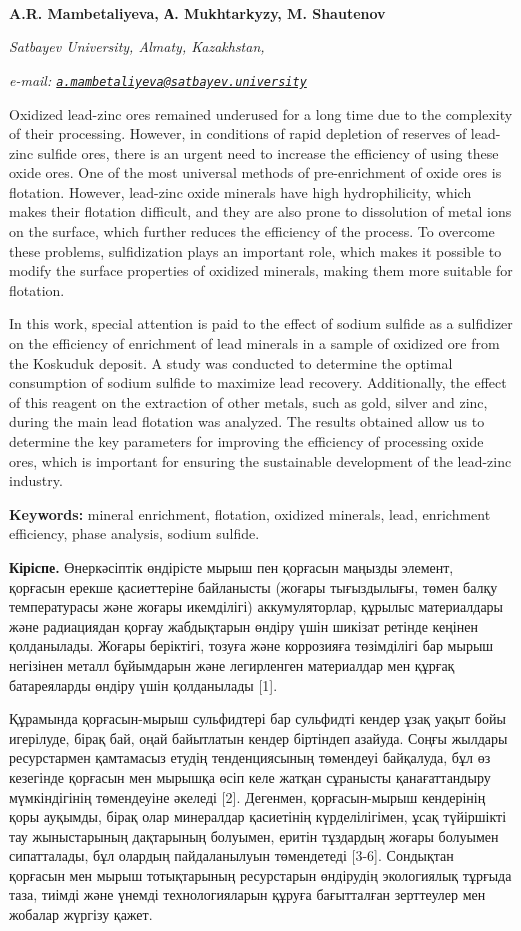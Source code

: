 {{\bfseries A.R. Mambetaliyeva\textsuperscript{\envelope }, А. Mukhtarkyzy, M.
Shautenov}

\emph{Satbayev University, Almaty, Kazakhstan,}

\emph{e-mail:
\href{mailto:a.mambetaliyeva@satbayev.university}{\nolinkurl{a.mambetaliyeva@satbayev.university}}}

Oxidized lead-zinc ores remained underused for a long time due to the
complexity of their processing. However, in conditions of rapid
depletion of reserves of lead-zinc sulfide ores, there is an urgent need
to increase the efficiency of using these oxide ores. One of the most
universal methods of pre-enrichment of oxide ores is flotation. However,
lead-zinc oxide minerals have high hydrophilicity, which makes their
flotation difficult, and they are also prone to dissolution of metal
ions on the surface, which further reduces the efficiency of the
process. To overcome these problems, sulfidization plays an important
role, which makes it possible to modify the surface properties of
oxidized minerals, making them more suitable for flotation.

In this work, special attention is paid to the effect of sodium sulfide
as a sulfidizer on the efficiency of enrichment of lead minerals in a
sample of oxidized ore from the Koskuduk deposit. A study was conducted
to determine the optimal consumption of sodium sulfide to maximize lead
recovery. Additionally, the effect of this reagent on the extraction of
other metals, such as gold, silver and zinc, during the main lead
flotation was analyzed. The results obtained allow us to determine the
key parameters for improving the efficiency of processing oxide ores,
which is important for ensuring the sustainable development of the
lead-zinc industry.

{\bfseries Keywords:} mineral enrichment, flotation, oxidized minerals,
lead, enrichment efficiency, phase analysis, sodium sulfide.

{\bfseries Кіріспе.} Өнеркәсіптік өндірісте мырыш пен қорғасын маңызды
элемент, қорғасын ерекше қасиеттеріне байланысты (жоғары тығыздылығы,
төмен балқу температурасы және жоғары икемділігі) аккумуляторлар,
құрылыс материалдары және радиациядан қорғау жабдықтарын өндіру үшін
шикізат ретінде кеңінен қолданылады. Жоғары беріктігі, тозуға және
коррозияға төзімділігі бар мырыш негізінен металл бұйымдарын және
легирленген материалдар мен құрғақ батареяларды өндіру үшін қолданылады
{[}1{]}.

Құрамында қорғасын-мырыш сульфидтері бар сульфидті кендер ұзақ уақыт
бойы игерілуде, бірақ бай, оңай байытлатын кендер біртіндеп азайуда.
Соңғы жылдары ресурстармен қамтамасыз етудің тенденциясының төмендеуі
байқалуда, бұл өз кезегінде қорғасын мен мырышқа өсіп келе жатқан
сұранысты қанағаттандыру мүмкіндігінің төмендеуіне әкеледі {[}2{]}.
Дегенмен, қорғасын-мырыш кендерінің қоры ауқымды, бірақ олар минералдар
қасиетінің күрделілігімен, ұсақ түйіршікті тау жыныстарының дақтарының
болуымен, еритін тұздардың жоғары болуымен сипатталады, бұл олардың
пайдаланылуын төмендетеді {[}3-6{]}. Сондықтан қорғасын мен мырыш
тотықтарының ресурстарын өндірудің экологиялық тұрғыда таза, тиімді және
үнемді технологияларын құруға бағытталған зерттеулер мен жобалар жүргізу
қажет.

}
